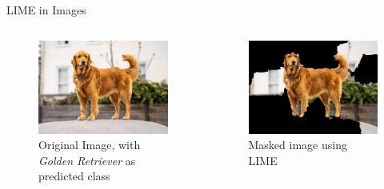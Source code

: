 \documentclass[final]{beamer}
\newlength{\colwidth}
\begin{document}
\begin{frame}[t]
\begin{columns}[t]
\begin{column}{\colwidth}
\begin{block}{LIME in Images}
    \begin{columns}
      \begin{column}{0.5\textwidth}
        \begin{figure}
          \centering
          \includegraphics[width=0.9\linewidth]{images/dog.jpeg}
          \caption{Original Image, with \emph{Golden Retriever} as predicted class}
        \end{figure} 
      \end{column}

      \begin{column}{0.5\textwidth}
        \begin{figure}
          \centering
          \includegraphics[width=0.9\linewidth]{images/lime.png}
          \caption{Masked image using LIME}
        \end{figure}
      \end{column}


\end{columns}
\end{block}
\end{column}
\end{columns}
\end{frame}
\end{document}
